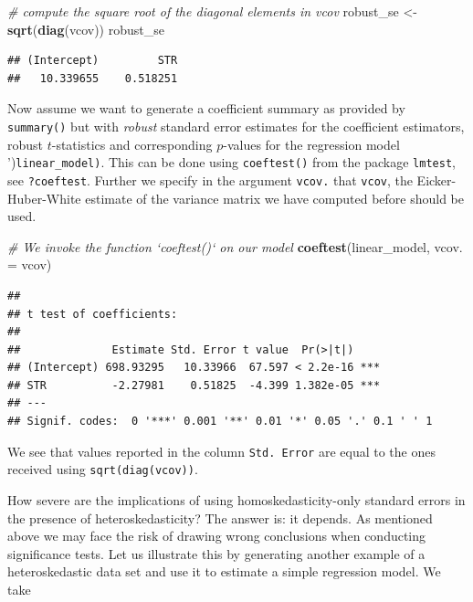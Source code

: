 \documentclass[]{book}
\newenvironment{Shaded}{\begin{snugshade}}{\end{snugshade}}
\newcommand{\KeywordTok}[1]{\textcolor[rgb]{0.13,0.29,0.53}{\textbf{#1}}}
\newcommand{\DataTypeTok}[1]{\textcolor[rgb]{0.13,0.29,0.53}{#1}}
\newcommand{\StringTok}[1]{\textcolor[rgb]{0.31,0.60,0.02}{#1}}
\newcommand{\CommentTok}[1]{\textcolor[rgb]{0.56,0.35,0.01}{\textit{#1}}}
\newcommand{\NormalTok}[1]{#1}
\theoremstyle{definition}
\theoremstyle{definition}
\theoremstyle{definition}
\theoremstyle{remark}
\begin{document}
\begin{Shaded}
\begin{Highlighting}[]
\CommentTok{# compute the square root of the diagonal elements in vcov}
\NormalTok{robust_se <-}\StringTok{ }\KeywordTok{sqrt}\NormalTok{(}\KeywordTok{diag}\NormalTok{(vcov))}
\NormalTok{robust_se}
\end{Highlighting}
\end{Shaded}

\begin{verbatim}
## (Intercept)         STR 
##   10.339655    0.518251
\end{verbatim}

Now assume we want to generate a coefficient summary as provided by
\texttt{summary()} but with \emph{robust} standard error estimates for
the coefficient estimators, robust \(t\)-statistics and corresponding
\(p\)-values for the regression model
')\texttt{linear\_model\textquotesingle{})}. This can be done using
\texttt{coeftest()} from the package \texttt{lmtest}, see
\texttt{?coeftest}. Further we specify in the argument \texttt{vcov.}
that \texttt{vcov}, the Eicker-Huber-White estimate of the variance
matrix we have computed before should be used.

\begin{Shaded}
\begin{Highlighting}[]
\CommentTok{# We invoke the function `coeftest()` on our model}
\KeywordTok{coeftest}\NormalTok{(linear_model, }\DataTypeTok{vcov. =}\NormalTok{ vcov)}
\end{Highlighting}
\end{Shaded}

\begin{verbatim}
## 
## t test of coefficients:
## 
##              Estimate Std. Error t value  Pr(>|t|)    
## (Intercept) 698.93295   10.33966  67.597 < 2.2e-16 ***
## STR          -2.27981    0.51825  -4.399 1.382e-05 ***
## ---
## Signif. codes:  0 '***' 0.001 '**' 0.01 '*' 0.05 '.' 0.1 ' ' 1
\end{verbatim}

We see that values reported in the column \texttt{Std. Error} are equal
to the ones received using \texttt{sqrt(diag(vcov))}.

How severe are the implications of using homoskedasticity-only standard
errors in the presence of heteroskedasticity? The answer is: it depends.
As mentioned above we may face the risk of drawing wrong conclusions
when conducting significance tests. Let us illustrate this by generating
another example of a heteroskedastic data set and use it to estimate a
simple regression model. We take
\end{document}
